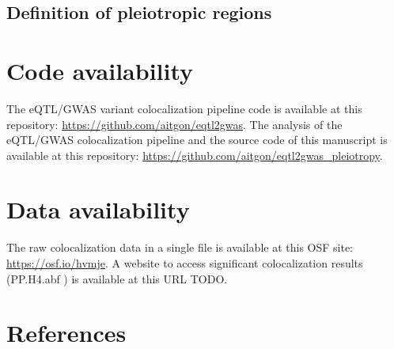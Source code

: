 \subsection*{Definition of pleiotropic regions}

\section*{Code availability}

The eQTL/GWAS variant colocalization pipeline code is available at this repository: \url{https://github.com/aitgon/eqtl2gwas}.
%
The analysis of the eQTL/GWAS colocalization pipeline and the source code of this manuscript is available at this repository: \url{https://github.com/aitgon/eqtl2gwas_pleiotropy}.

\section*{Data availability}

The raw colocalization data in a single file is available at this OSF site: \url{https://osf.io/hvmje}.
%
A website to access significant colocalization results (PP.H4.abf ) is available at this URL TODO.


\section*{References}




